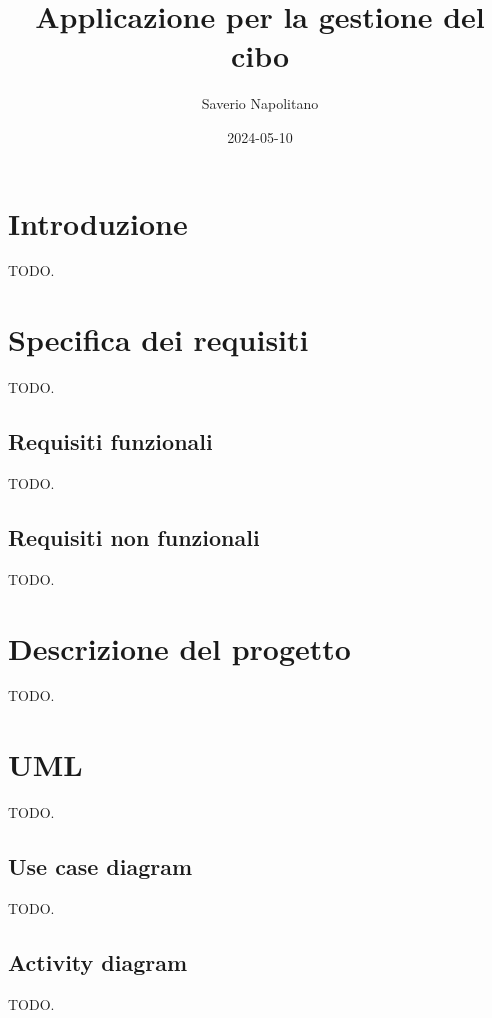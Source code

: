 \documentclass{article}
\title{Applicazione per la gestione del cibo}
\date{2024-05-10}
\author{Saverio Napolitano}
\begin{document}
\maketitle


\newpage


\section{Introduzione}

TODO.

\section{Specifica dei requisiti}

TODO.

\subsection{Requisiti funzionali}

TODO.

\subsection{Requisiti non funzionali}

TODO.

\section{Descrizione del progetto}

TODO.

\section{UML}

TODO.

\subsection{Use case diagram}

TODO.

\subsection{Activity diagram}

TODO.
\end{document}
